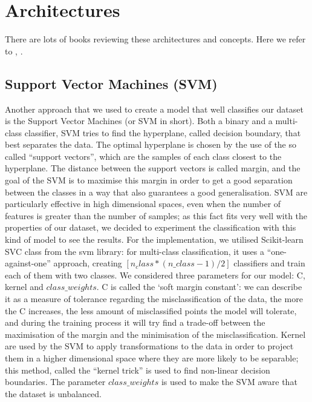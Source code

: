 \documentclass{article}
\begin{document}
\section{Architectures}
There are lots of books reviewing these architectures and concepts. Here we refer to \cite{geron2017hands} , \cite{bishop2006pattern} \cite{hertz1991introduction}.


\subsection{Support Vector Machines (SVM)}
Another approach that we used to create a model that well classifies our dataset is the Support Vector Machines (or SVM in short). Both a binary and a multi-class classifier, SVM tries to find the hyperplane, called decision boundary, that best separates the data. The optimal hyperplane is chosen by the use of the so called “support vectors”, which are the samples of each class closest to the hyperplane. The distance between the support vectors is called margin, and the goal of the SVM is to maximise this margin in order to get a good separation between the classes in a way that also guarantees a good generalisation. 
SVM are particularly effective in high dimensional spaces, even when the number of features is greater than the number of samples; as this fact fits very well with the properties of our dataset, we decided to experiment the classification with this kind of model to see the results. 
For the implementation, we utilised Scikit-learn SVC class from the svm library: for multi-class classification, it uses a “one-against-one” approach, creating $[n_class*(n\_class-1)/2]$ classifiers and train each of them with two classes. We considered three parameters for our model: C, kernel and $class\_weights$. 
C is called the ‘soft margin constant’: we can describe it as a measure of tolerance regarding the misclassification of the data, the more the C increases, the less amount of misclassified points the model will tolerate, and during the training process it will try find a trade-off between the maximisation of the margin and the minimisation of the misclassification. 
Kernel are used by the SVM to apply transformations to the data in order to project them in a higher dimensional space where they are more likely to be separable; this method, called the “kernel trick” is used to find non-linear decision boundaries. 
The parameter $class\_weights$ is used to make the SVM aware that the dataset is unbalanced. 
\end{document}
